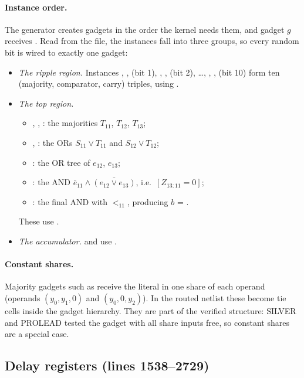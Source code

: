 \paragraph{Instance order.} The generator creates gadgets in the order the kernel needs them, and gadget $g$ receives . Read from the file, the instances fall into three groups, so every random bit is wired to exactly one gadget:
\begin{itemize}
  \item \emph{The ripple region.} Instances , ,  (bit 1), , ,  (bit 2), \ldots, , ,  (bit 10) form ten (majority, comparator, carry) triples, using .
  \item \emph{The top region.}
    \begin{itemize}
      \item {}, , : the majorities $T_{11}$, $T_{12}$, $T_{13}$;
      \item {}, : the ORs $S_{11} \vee T_{11}$ and $S_{12} \vee T_{12}$;
      \item {}: the OR tree of $e_{12}$, $e_{13}$;
      \item {}: the AND $\bar e_{11} \wedge \overline{(e_{12} \vee e_{13})}$, i.e.\ $[Z_{13:11} = 0]$;
      \item {}: the final AND with $\lt_{11}$, producing $b$ = .
    \end{itemize}
    These use .
  \item \emph{The accumulator.}  and  use .
\end{itemize}

\paragraph{Constant shares.} Majority gadgets such as  receive the literal  in one share of each operand (operands $(y_0, y_1, 0)$ and $(y_0, 0, y_2)$). In the routed netlist these become tie cells inside the gadget hierarchy. They are part of the verified structure: SILVER and PROLEAD tested the gadget with all share inputs free, so constant shares are a special case.

\subsection{Delay registers (lines 1538--2729)}\label{app:v-delays}

